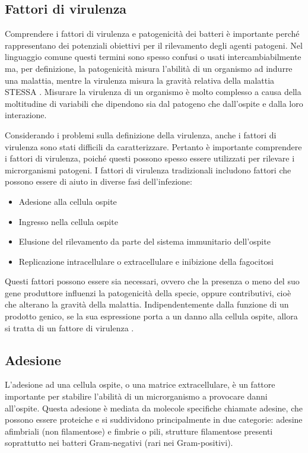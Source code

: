\documentclass[../main.tex]{subfiles}
\begin{document}
\subsection{Fattori di virulenza}

Comprendere i fattori di virulenza e patogenicità dei batteri è importante perché rappresentano dei potenziali obiettivi per il rilevamento degli agenti patogeni. Nel linguaggio comune questi termini sono spesso confusi o usati intercambiabilmente ma, per definizione, la patogenicità misura l'abilità di un organismo ad indurre una malattia, mentre la virulenza misura la gravità relativa della malattia STESSA \cite{watson_1949}. Misurare la virulenza di un organismo è molto complesso a causa della moltitudine di variabili che dipendono sia dal patogeno che dall'ospite e dalla loro interazione.\cite{casadevall_2001}

Considerando i problemi sulla definizione della virulenza, anche i fattori di virulenza sono stati difficili da caratterizzare. Pertanto è importante comprendere i fattori di virulenza, poiché questi possono spesso essere utilizzati per rilevare i microrganismi patogeni. I fattori di virulenza tradizionali includono fattori che possono essere di aiuto in diverse fasi dell'infezione: \cite{love_2008}

\begin{itemize}
	\itemsep0em 
	\item Adesione alla cellula ospite
	\item Ingresso nella cellula ospite
	\item Elusione del rilevamento da parte del sistema immunitario dell'ospite
	\item Replicazione intracellulare o extracellulare e inibizione della fagocitosi
\end{itemize}

Questi fattori possono essere sia necessari, ovvero che la presenza o meno del suo gene produttore influenzi la patogenicità della specie, oppure contributivi, cioè che alterano la gravità della malattia. Indipendentemente dalla funzione di un prodotto genico, se la sua espressione porta a un danno alla cellula ospite, allora si tratta di un fattore di virulenza \cite{casadevall_1999}.

\subsection{Adesione}

L'adesione ad una cellula ospite, o una matrice extracellulare, è un fattore importante per stabilire l'abilità di un microrganismo a provocare danni all'ospite. Questa adesione è mediata da molecole specifiche chiamate adesine, che possono essere proteiche e si suddividono principalmente in due categorie: adesine afimbriali (non filamentose) e fimbrie o pili, strutture filamentose presenti soprattutto nei batteri Gram-negativi (rari nei Gram-positivi).
\end{document}
